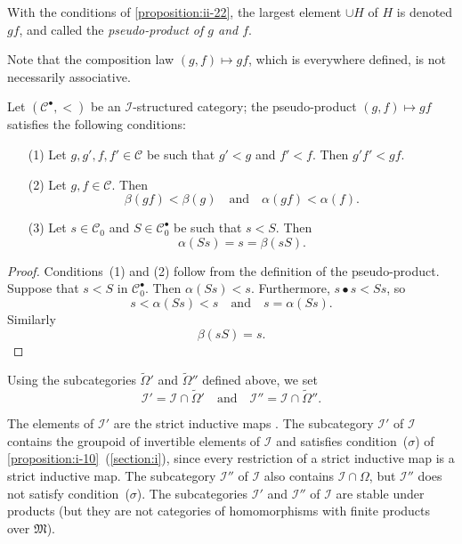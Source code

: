 \documentclass[a4paper,fleqn]{article}
\theoremstyle{plain}
\newenvironment{proposition}[1]
  {\renewcommand\theinnerproposition{#1}\innerproposition}
  {\endinnerproposition}
\theoremstyle{definition}
\newenvironment{definition}[1]
  {\renewcommand\theinnerdefinition{#1}\innerdefinition}
  {\endinnerdefinition}
\newcommand{\oldpage}[1]{{\marginpar{\footnotesize$\bigg\vert$\,\,\,\,\textit{p.~#1}}}}
\newcommand{\textand}{\quad\text{and}\quad}
\newcommand{\CC}{\mathcal{C}}
\newcommand{\MM}{\mathfrak{M}}
\newcommand{\II}{\mathcal{I}}
\begin{document}
\begin{definition}{20}
\label{definition:ii-20}
  With the conditions of \cref{proposition:ii-22}, the largest element $\cup H$ of $H$ is denoted $gf$, and called the \emph{pseudo-product of $g$ and $f$}.
\end{definition}

Note that the composition law $(g,f)\mapsto gf$, which is everywhere defined, is not necessarily associative.

\begin{proposition}{23}
\label{proposition:ii-23}
  Let $(\CC^\bullet,<)$ be an $\II$-structured category;
  the pseudo-product $(g,f)\mapsto gf$ satisfies the following conditions:
  \begin{enumerate}
    \item[\normalfont(1)]
      Let $g,g',f,f'\in\CC$ be such that $g'<g$ and $f'<f$.
      Then $g'f'<gf$.
    \item[\normalfont(2)]
      Let $g,f\in\CC$.
      Then
      \[
        \beta(gf)<\beta(g)
        \textand
        \alpha(gf)<\alpha(f).
      \]
    \item[\normalfont(3)]
      \oldpage{405}
      Let $s\in\CC_0$ and $S\in\CC_0^\bullet$ be such that $s<S$.
      Then
      \[
        \alpha(Ss)
        = s
        = \beta(sS).
      \]
  \end{enumerate}
\end{proposition}

\begin{proof}
  Conditions~(1) and (2) follow from the definition of the pseudo-product.
  Suppose that $s<S$ in $\CC_0^\bullet$.
  Then $\alpha(Ss)<s$.
  Furthermore, $s\bullet s<Ss$, so
  \[
    s < \alpha(Ss) < s
    \textand
    s = \alpha(Ss).
  \]
  Similarly
  \[
    \beta(sS)
    = s.
  \]
\end{proof}

Using the subcategories $\widetilde{\Omega}'$ and $\widetilde{\Omega}''$ defined above, we set
\[
  \II' = \II\cap\widetilde{\Omega}'
  \textand
  \II'' = \II\cap\widetilde{\Omega}''.
\]

The elements of $\II'$ are the strict inductive maps \cite{3a}.
The subcategory $\II'$ of $\II$ contains the groupoid of invertible elements of $\II$ and satisfies condition~($\sigma$) of \cref{proposition:i-10}~(\cref{section:i}), since every restriction of a strict inductive map is a strict inductive map.
The subcategory $\II''$ of $\II$ also contains $\II\cap\Omega$, but $\II''$ does not satisfy condition~($\sigma$).
The subcategories $\II'$ and $\II''$ of $\II$ are stable under products (but they are not categories of homomorphisms with finite products over $\MM$).
\end{document}
